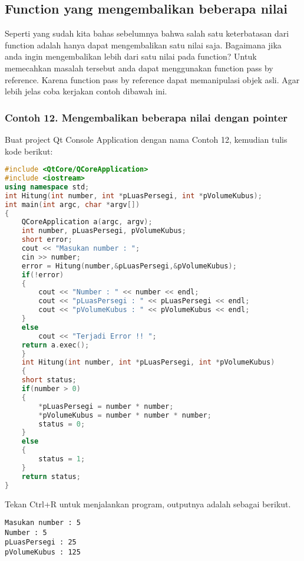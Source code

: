 \subsection{Function yang mengembalikan beberapa
nilai}\label{function-yang-mengembalikan-beberapa-nilai}

Seperti yang sudah kita bahas sebelumnya bahwa salah satu keterbatasan
dari function adalah hanya dapat mengembalikan satu nilai saja.
Bagaimana jika anda ingin mengembalikan lebih dari satu nilai pada
function? Untuk memecahkan masalah tersebut anda dapat menggunakan
function pass by reference. Karena function pass by reference dapat
memanipulasi objek asli. Agar lebih jelas coba kerjakan contoh dibawah
ini.

\subsubsection*{Contoh 12. Mengembalikan beberapa nilai dengan pointer}

Buat project Qt Console Application dengan nama Contoh 12, kemudian
tulis kode berikut:

\begin{lstlisting}[language=c++]
#include <QtCore/QCoreApplication>
#include <iostream>
using namespace std;
int Hitung(int number, int *pLuasPersegi, int *pVolumeKubus);
int main(int argc, char *argv[])
{
    QCoreApplication a(argc, argv);
    int number, pLuasPersegi, pVolumeKubus;
    short error;
    cout << "Masukan number : ";
    cin >> number;
    error = Hitung(number,&pLuasPersegi,&pVolumeKubus);
    if(!error)
    {
        cout << "Number : " << number << endl;
        cout << "pLuasPersegi : " << pLuasPersegi << endl;
        cout << "pVolumeKubus : " << pVolumeKubus << endl;
    }
    else
        cout << "Terjadi Error !! ";
    return a.exec();
    }
    int Hitung(int number, int *pLuasPersegi, int *pVolumeKubus)
    {
    short status;
    if(number > 0)
    {
        *pLuasPersegi = number * number;
        *pVolumeKubus = number * number * number;
        status = 0;
    }
    else
    {
        status = 1;
    }
    return status;
}
\end{lstlisting}

Tekan Ctrl+R untuk menjalankan program, outputnya adalah sebagai
berikut.

\begin{verbatim}
Masukan number : 5
Number : 5
pLuasPersegi : 25
pVolumeKubus : 125
\end{verbatim}

